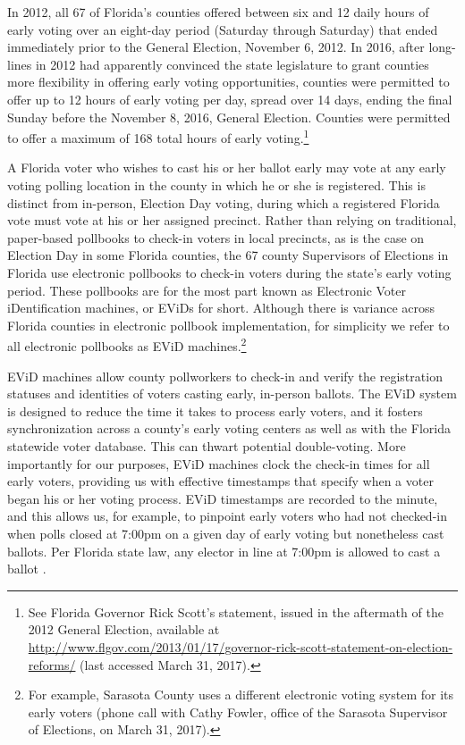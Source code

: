 \documentclass[12pt,titlepage]{article}
\begin{document}
In 2012, all 67 of Florida's counties offered between six and 12 daily
hours of early voting over an eight-day period (Saturday through
Saturday) that ended immediately prior to the General Election,
November 6, 2012.  In 2016, after long-lines in 2012 had apparently
convinced the state legislature to grant counties more flexibility in
offering early voting opportunities, counties were permitted to offer
up to 12 hours of early voting per day, spread over 14 days, ending
the final Sunday before the November 8, 2016, General Election.
Counties were permitted to offer a maximum of 168 total hours of early
voting.\footnote{See Florida Governor Rick Scott's statement, issued
  in the aftermath of the 2012 General Election, available at
  \url{http://www.flgov.com/2013/01/17/governor-rick-scott-statement-on-election-reforms/}
  (last accessed March 31, 2017).}

A Florida voter who wishes to cast his or her ballot early may vote at
any early voting polling location in the county in which he or she is
registered.  This is distinct from in-person, Election Day voting,
during which a registered Florida vote must vote at his or her
assigned precinct.  Rather than relying on traditional, paper-based
pollbooks to check-in voters in local precincts, as is the case on
Election Day in some Florida counties, the 67 county Supervisors of
Elections in Florida use electronic pollbooks to check-in voters
during the state's early voting period.  These pollbooks are for the
most part known as Electronic Voter iDentification machines, or EViDs
for short.  Although there is variance across Florida counties in
electronic pollbook implementation, for simplicity we refer to all
electronic pollbooks as EViD machines.\footnote{For example, Sarasota
  County uses a different electronic voting system for its early
  voters (phone call with Cathy Fowler, office of the Sarasota
  Supervisor of Elections, on March 31, 2017).}


EViD machines allow county pollworkers to check-in and verify the
registration statuses and identities of voters casting early,
in-person ballots. The EViD system is designed to reduce the time it
takes to process early voters, and it fosters synchronization across a
county's early voting centers as well as with the Florida statewide
voter database.  This can thwart potential double-voting.  More
importantly for our purposes, EViD machines clock the check-in times
for all early voters, providing us with effective timestamps that
specify when a voter began his or her voting process. EViD timestamps
are recorded to the minute, and this allows us, for example, to
pinpoint early voters who had not checked-in when polls closed at
7:00pm on a given day of early voting but nonetheless cast ballots.
Per Florida state law, any elector in line at 7:00pm is allowed to
cast a ballot \citet{FLStatutes:7pm}.
\end{document}
